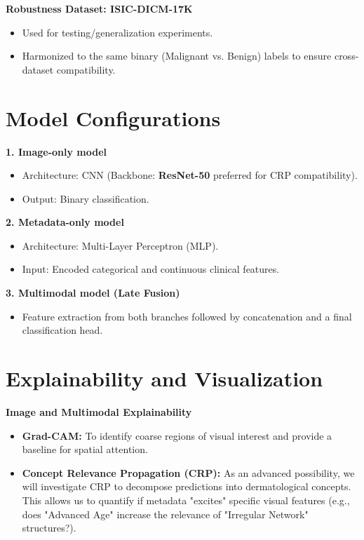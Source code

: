 \documentclass[12pt]{extarticle}
\begin{document}
\textbf{Robustness Dataset: ISIC-DICM-17K}

\begin{itemize}
\item Used for testing/generalization experiments.
\item Harmonized to the same binary (Malignant vs. Benign) labels to ensure cross-dataset compatibility.
\end{itemize}


\section*{Model Configurations}

\textbf{1. Image-only model}
\begin{itemize}
\item Architecture: CNN (Backbone: \textbf{ResNet-50} preferred for CRP compatibility).
\item Output: Binary classification.
\end{itemize}

\textbf{2. Metadata-only model}
\begin{itemize}
\item Architecture: Multi-Layer Perceptron (MLP).
\item Input: Encoded categorical and continuous clinical features.
\end{itemize}

\textbf{3. Multimodal model (Late Fusion)}
\begin{itemize}
\item Feature extraction from both branches followed by concatenation and a final classification head.
\end{itemize}


\section*{Explainability and Visualization}

\textbf{Image and Multimodal Explainability}
\begin{itemize}
\item \textbf{Grad-CAM:} To identify coarse regions of visual interest and provide a baseline for spatial attention.
\item \textbf{Concept Relevance Propagation (CRP):} As an advanced possibility, we will investigate CRP to decompose predictions into dermatological concepts. This allows us to quantify if metadata "excites" specific visual features (e.g., does "Advanced Age" increase the relevance of "Irregular Network" structures?).
\end{itemize}
\end{document}
